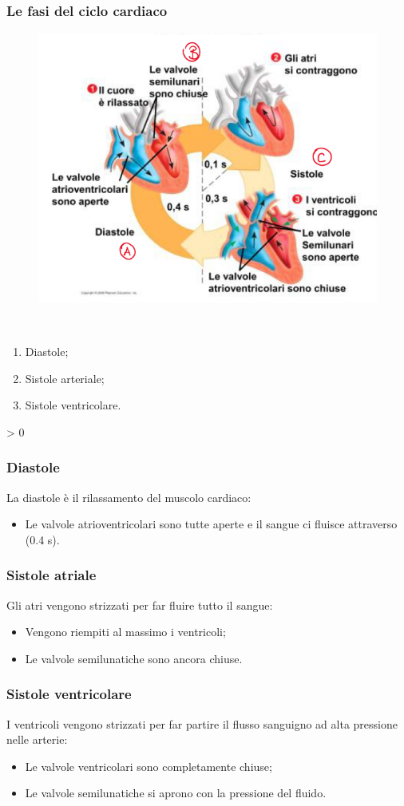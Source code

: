 \documentclass{article}
\makeatletter
\newcommand{\wrapfill}{
    \par
    \ifnum \value{WF@wrappedlines} > 0
        \addtocounter{WF@wrappedlines}{-1}%
        \null\vspace{
            \arabic{WF@wrappedlines}
            \baselineskip
        }
        \WFclear
    \fi
    \phantom{}
}
\makeatother
\begin{document}
\subsubsection{Le fasi del ciclo cardiaco}
\setlength{\intextsep}{0pt}%
\begin{figure}
    \includegraphics[width=.5\textwidth]{media/ciclo-cardiaco.png}
    \vspace{-2.4cm}
\end{figure}
\phantom{}\\
\begin{enumerate}[label=\Alph*)]
    \item Diastole;
    \item Sistole arteriale;
    \item Sistole ventricolare.
\end{enumerate}
\wrapfill

\subsubsection{Diastole}
La diastole è il rilassamento del muscolo cardiaco:
\begin{itemize}
    \item Le valvole atrioventricolari sono tutte aperte e il sangue ci fluisce attraverso
        (0.4 s).
\end{itemize}

\subsubsection{Sistole atriale}
Gli atri vengono strizzati per far fluire tutto il sangue:
\begin{itemize}
    \item Vengono riempiti al massimo i ventricoli;
    \item Le valvole semilunatiche sono ancora chiuse.
\end{itemize}

\subsubsection{Sistole ventricolare}
I ventricoli vengono strizzati per far partire il flusso sanguigno ad alta pressione nelle
arterie:
\begin{itemize}
    \item Le valvole ventricolari sono completamente chiuse;
    \item Le valvole semilunatiche si aprono con la pressione del fluido.
\end{itemize}
\end{document}
